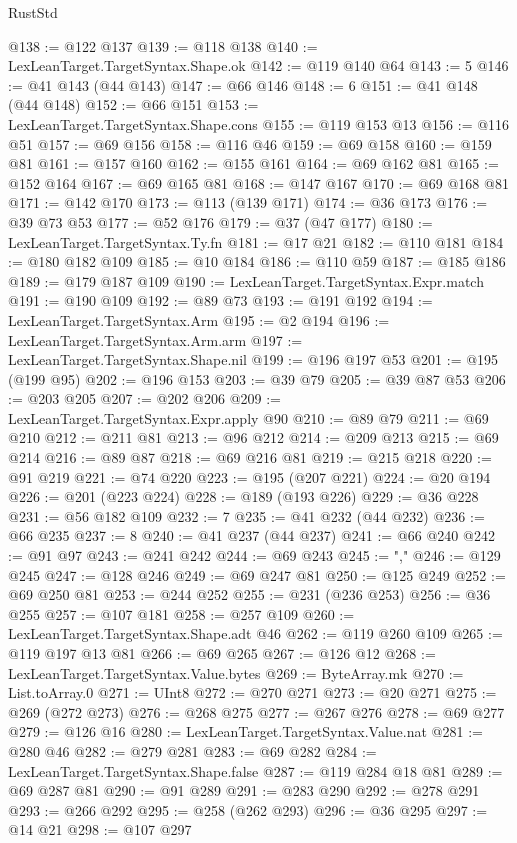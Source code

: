 \begin{lexlean}{RustStd}
\begin{coremodule}
@138 := @122 @137
@139 := @118 @138
@140 := LexLeanTarget.TargetSyntax.Shape.ok
@142 := @119 @140 @64
@143 := 5
@146 := @41 @143 (@44 @143)
@147 := @66 @146
@148 := 6
@151 := @41 @148 (@44 @148)
@152 := @66 @151
@153 := LexLeanTarget.TargetSyntax.Shape.cons
@155 := @119 @153 @13
@156 := @116 @51
@157 := @69 @156
@158 := @116 @46
@159 := @69 @158
@160 := @159 @81
@161 := @157 @160
@162 := @155 @161
@164 := @69 @162 @81
@165 := @152 @164
@167 := @69 @165 @81
@168 := @147 @167
@170 := @69 @168 @81
@171 := @142 @170
@173 := @113 (@139 @171)
@174 := @36 @173
@176 := @39 @73 @53
@177 := @52 @176
@179 := @37 (@47 @177)
@180 := LexLeanTarget.TargetSyntax.Ty.fn
@181 := @17 @21
@182 := @110 @181
@184 := @180 @182 @109
@185 := @10 @184
@186 := @110 @59
@187 := @185 @186
@189 := @179 @187 @109
@190 := LexLeanTarget.TargetSyntax.Expr.match
@191 := @190 @109
@192 := @89 @73
@193 := @191 @192
@194 := LexLeanTarget.TargetSyntax.Arm
@195 := @2 @194
@196 := LexLeanTarget.TargetSyntax.Arm.arm
@197 := LexLeanTarget.TargetSyntax.Shape.nil
@199 := @196 @197 @53
@201 := @195 (@199 @95)
@202 := @196 @153
@203 := @39 @79
@205 := @39 @87 @53
@206 := @203 @205
@207 := @202 @206
@209 := LexLeanTarget.TargetSyntax.Expr.apply @90
@210 := @89 @79
@211 := @69 @210
@212 := @211 @81
@213 := @96 @212
@214 := @209 @213
@215 := @69 @214
@216 := @89 @87
@218 := @69 @216 @81
@219 := @215 @218
@220 := @91 @219
@221 := @74 @220
@223 := @195 (@207 @221)
@224 := @20 @194
@226 := @201 (@223 @224)
@228 := @189 (@193 @226)
@229 := @36 @228
@231 := @56 @182 @109
@232 := 7
@235 := @41 @232 (@44 @232)
@236 := @66 @235
@237 := 8
@240 := @41 @237 (@44 @237)
@241 := @66 @240
@242 := @91 @97
@243 := @241 @242
@244 := @69 @243
@245 := ","
@246 := @129 @245
@247 := @128 @246
@249 := @69 @247 @81
@250 := @125 @249
@252 := @69 @250 @81
@253 := @244 @252
@255 := @231 (@236 @253)
@256 := @36 @255
@257 := @107 @181
@258 := @257 @109
@260 := LexLeanTarget.TargetSyntax.Shape.adt @46
@262 := @119 @260 @109
@265 := @119 @197 @13 @81
@266 := @69 @265
@267 := @126 @12
@268 := LexLeanTarget.TargetSyntax.Value.bytes
@269 := ByteArray.mk
@270 := List.toArray.{0}
@271 := UInt8
@272 := @270 @271
@273 := @20 @271
@275 := @269 (@272 @273)
@276 := @268 @275
@277 := @267 @276
@278 := @69 @277
@279 := @126 @16
@280 := LexLeanTarget.TargetSyntax.Value.nat
@281 := @280 @46
@282 := @279 @281
@283 := @69 @282
@284 := LexLeanTarget.TargetSyntax.Shape.false
@287 := @119 @284 @18 @81
@289 := @69 @287 @81
@290 := @91 @289
@291 := @283 @290
@292 := @278 @291
@293 := @266 @292
@295 := @258 (@262 @293)
@296 := @36 @295
@297 := @14 @21
@298 := @107 @297

\end{coremodule}
\end{lexlean}
